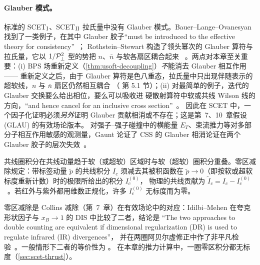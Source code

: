 \paragraph{Glauber 模式。}
标准的 SCET$_{\rm I}$、SCET$_{\rm II}$ 拉氏量中没有 Glauber 模式。Bauer--Lange--Ovanesyan 找到了一类例子，在其中
Glauber 胶子“must be introduced to the effective theory for consistency”~\cite{BauerLangeOvanesyan2011}；
Rothstein--Stewart 构造了领头幂次的 Glauber 算符与拉氏量，它以 $1/\mathcal P_{\perp}^2$ 型的势把 $n$、$\bar n$ 与软各扇区耦合起来
~\cite{RothsteinStewart2016}。两点对本章至关重要：(i) BPS 场重新定义（\cref{thm:usoft-decoupling}）\emph{不}能消去 Glauber 相互作用——
重新定义之后，由于 Glauber 算符是色八重态，拉氏量中只出现伴随表示的超软线，$n$ 与 $\bar n$ 扇区仍然相互耦合
（\cite{RothsteinStewart2016} 第 5.1 节）；(ii) 对最简单的例子，迭代的 Glauber 交换要么给出相位，要么可以吸收进
硬散射算符中软或共线 Wilson 线的方向，“and hence cancel for an inclusive cross section”~\cite{RothsteinStewart2016}。
因此在 SCET 中，一个因子化证明必须\emph{另外}证明 Glauber 贡献相消或不存在；这是第~7、10~章假设 (GLAU) 的有效场论版本。
对强子–强子碰撞中的横能量 $E_T$、束流推力等对多部分子相互作用敏感的观测量，Gaunt 论证了 CSS 的 Glauber 相消论证在两个 Glauber
胶子的层次失效~\cite{Gaunt2014}。

\begin{definition}[零区减除]\label{def:zero-bin}
共线圈积分在共线动量趋于软（或超软）区域时与软（超软）圈积分重叠。零区减除规定：带标签动量 $\tilde p$ 的共线积分
$I_c$ 须减去其被积函数在 $\tilde p\to0$（即按软或超软标度重新计数）时的极限所给出的积分 $I_c^{(0)}$，
物理的共线贡献为 $\tilde I_c=I_c-I_c^{(0)}$~\cite{ManoharStewart2007}。若红外与紫外都用维数正规化，许多 $I_c^{(0)}$ 无标度而为零。
\end{definition}

零区减除是 Collins 减除（第~7~章）在有效场论中的对应：Idilbi--Mehen 在夸克形状因子与 $x_B\to1$ 的 DIS 中比较了二者，结论是
“The two approaches to double counting are equivalent if dimensional regularization (DR) is used to regulate infrared (IR) divergences”，
并在两圈阿贝尔虚修正中作了非平凡检验~\cite{IdilbiMehen2007}。一般情形下二者的等价性为 \tagA。
在本章的推力计算中，一圈零区积分都无标度（\cref{sec:scet-thrust}）。

